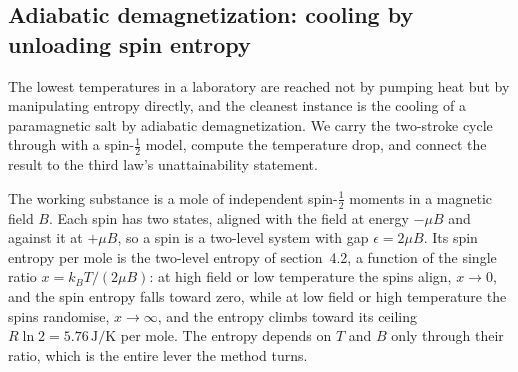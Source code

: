 \subsection{Adiabatic demagnetization: cooling by unloading spin entropy}

The lowest temperatures in a laboratory are reached not by pumping heat but by
manipulating entropy directly, and the cleanest instance is the cooling of a
paramagnetic salt by adiabatic demagnetization. We carry the two-stroke cycle
through with a spin-$\tfrac12$ model, compute the temperature drop, and connect
the result to the third law's unattainability statement.

The working substance is a mole of independent spin-$\tfrac12$ moments in a
magnetic field $B$. Each spin has two states, aligned with the field at energy
$-\mu B$ and against it at $+\mu B$, so a spin is a two-level system with gap
$\epsilon = 2\mu B$. Its spin entropy per mole is the two-level entropy of
section~4.2, a function of the single ratio $x = k_B T/(2\mu B)$: at high field
or low temperature the spins align, $x \to 0$, and the spin entropy falls toward
zero, while at low field or high temperature the spins randomise, $x \to \infty$,
and the entropy climbs toward its ceiling $R\ln 2 = 5.76\,\si{\joule\per\kelvin}$
per mole. The entropy depends on $T$ and $B$ only through their ratio, which is
the entire lever the method turns.

